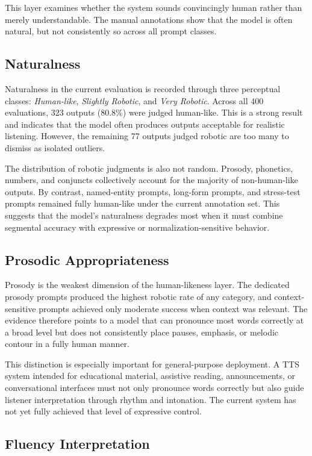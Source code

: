 This layer examines whether the system sounds convincingly human rather than merely understandable. The manual annotations show that the model is often natural, but not consistently so across all prompt classes.

\subsection{Naturalness}

Naturalness in the current evaluation is recorded through three perceptual classes: \textit{Human-like}, \textit{Slightly Robotic}, and \textit{Very Robotic}. Across all 400 evaluations, 323 outputs (80.8\%) were judged human-like. This is a strong result and indicates that the model often produces outputs acceptable for realistic listening. However, the remaining 77 outputs judged robotic are too many to dismiss as isolated outliers.

The distribution of robotic judgments is also not random. Prosody, phonetics, numbers, and conjuncts collectively account for the majority of non-human-like outputs. By contrast, named-entity prompts, long-form prompts, and stress-test prompts remained fully human-like under the current annotation set. This suggests that the model's naturalness degrades most when it must combine segmental accuracy with expressive or normalization-sensitive behavior.

\subsection{Prosodic Appropriateness}

Prosody is the weakest dimension of the human-likeness layer. The dedicated prosody prompts produced the highest robotic rate of any category, and context-sensitive prompts achieved only moderate success when context was relevant. The evidence therefore points to a model that can pronounce most words correctly at a broad level but does not consistently place pauses, emphasis, or melodic contour in a fully human manner.

This distinction is especially important for general-purpose deployment. A TTS system intended for educational material, assistive reading, announcements, or conversational interfaces must not only pronounce words correctly but also guide listener interpretation through rhythm and intonation. The current system has not yet fully achieved that level of expressive control.

\subsection{Fluency Interpretation}

